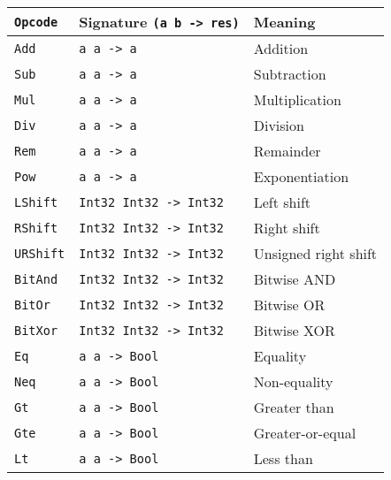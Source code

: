 \begin{table}
    \centering
    \begin{tabular}{l | l | l}
        \texttt{Opcode}      & Signature \texttt{(a b -> res)}    &  Meaning                    \\\hline
        \texttt{Add}         & \texttt{a      a     -> a        } &  Addition                   \\
        \texttt{Sub}         & \texttt{a      a     -> a        } &  Subtraction                \\
        \texttt{Mul}         & \texttt{a      a     -> a        } &  Multiplication             \\
        \texttt{Div}         & \texttt{a      a     -> a        } &  Division                   \\
        \texttt{Rem}         & \texttt{a      a     -> a        } &  Remainder                  \\
        \texttt{Pow}         & \texttt{a      a     -> a        } &  Exponentiation             \\
        \texttt{LShift}      & \texttt{Int32  Int32 -> Int32    } &  Left shift                 \\
        \texttt{RShift}      & \texttt{Int32  Int32 -> Int32    } &  Right shift                \\
        \texttt{URShift}     & \texttt{Int32  Int32 -> Int32    } &  Unsigned right shift       \\
        \texttt{BitAnd}      & \texttt{Int32  Int32 -> Int32    } &  Bitwise AND                \\
        \texttt{BitOr}       & \texttt{Int32  Int32 -> Int32    } &  Bitwise OR                 \\
        \texttt{BitXor}      & \texttt{Int32  Int32 -> Int32    } &  Bitwise XOR                \\
        \texttt{Eq}          & \texttt{a      a     -> Bool     } &  Equality                   \\
        \texttt{Neq}         & \texttt{a      a     -> Bool     } &  Non-equality               \\
        \texttt{Gt}          & \texttt{a      a     -> Bool     } &  Greater than               \\
        \texttt{Gte}         & \texttt{a      a     -> Bool     } &  Greater-or-equal           \\
        \texttt{Lt}          & \texttt{a      a     -> Bool     } &  Less than                  \\

\end{tabular}
\end{table}
